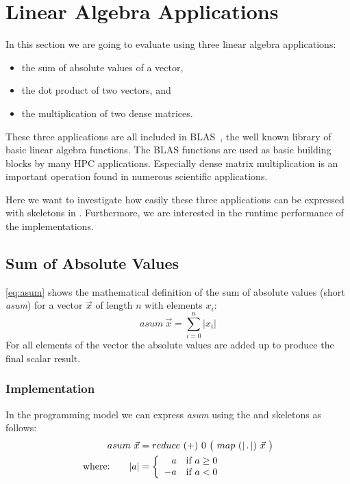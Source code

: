 \section{Linear Algebra Applications}
\label{section:skelcl:evaluation:linearAlgebra}

In this section we are going to evaluate \SkelCL using three linear algebra applications:
\begin{itemize}
  \item the sum of absolute values of a vector,
  \item the dot product of two vectors, and
  \item the multiplication of two dense matrices.
\end{itemize}

These three applications are all included in BLAS~\cite{Dongarra2002,Dongarra2002a}, the well known library of basic linear algebra functions.
The BLAS functions are used as basic building blocks by many HPC applications.
Especially dense matrix multiplication is an important operation found in numerous scientific applications.

Here we want to investigate how easily these three applications can be expressed with skeletons in \SkelCL.
Furthermore, we are interested in the runtime performance of the \SkelCL implementations.

\subsection{Sum of Absolute Values}
\label{sec:asum}
\autoref{eq:asum} shows the mathematical definition of the sum of absolute values (short \emph{asum}) for a vector $\vec{x}$ of length $n$ with elements $x_i$:
\begin{equation}
  asum\ \vec{x} = \sum_{i=0}^{n} | x_i |
  \label{eq:asum}
\end{equation}
For all elements of the vector the absolute values are added up to produce the final scalar result.

\subsubsection*{\SkelCL Implementation}
In the \SkelCL programming model we can express \emph{asum} using the \map and \reduce skeletons as follows:
\begin{align}
  asum\ \vec{x} &= reduce\ (+)\ 0\ \big(\ map\ (|\, .\, |)\ \vec{x}\ \big)\label{eq:asum:skelcl}\\
  \text{where:} \qquad | a | &=
    \left\{
      \begin{array}{r l}
      a & \text{if } a \geq 0\\
      -a & \text{if } a < 0
      \end{array}
    \right.\nonumber
\end{align}

